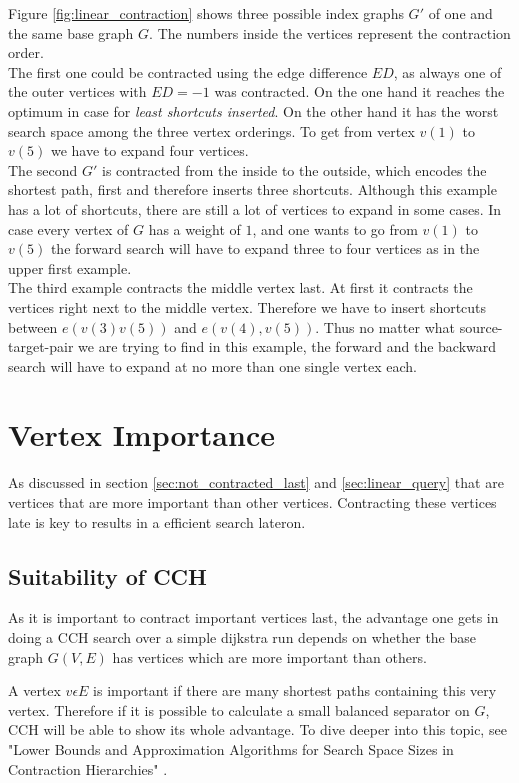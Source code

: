 Figure \ref{fig:linear_contraction} shows three possible index graphs $G'$ of one and the same base graph $G$.
The numbers inside the vertices represent the contraction order.
\\
The first one could be contracted using the edge difference $ED$, as always one of the outer vertices with $ED=-1$ was contracted.
On the one hand it reaches the optimum in case for \textit{least shortcuts inserted}.
On the other hand it has the worst search space among the three vertex orderings.
To get from vertex $v(1)$ to $v(5)$ we have to expand four vertices.
\\
The second $G'$ is contracted from the inside to the outside, which encodes the shortest path, first and therefore inserts three shortcuts.
Although this example has a lot of shortcuts, there are still a lot of vertices to expand in some cases.
In case every vertex of $G$ has a weight of $1$, and one wants to go from $v(1)$ to $v(5)$ the forward search will have to expand three to four vertices as in the upper first example.
\\
The third example contracts the middle vertex last.
At first it contracts the vertices right next to the middle vertex.
Therefore we have to insert shortcuts between $e(v(3)v(5))$ and $e(v(4), v(5))$.
Thus no matter what source-target-pair we are trying to find in this example, the forward and the backward search will have to expand at no more than one single vertex each.

\section{Vertex Importance}\label{sec:vertex_importance}

As discussed in section \ref{sec:not_contracted_last} and \ref{sec:linear_query} that are vertices that are more important than other vertices.
Contracting these vertices late is key to results in a efficient search lateron.


\subsection{Suitability of CCH}

As it is important to contract important vertices last, the advantage one gets in doing a CCH search over a simple dijkstra run depends on whether the base graph $G(V, E)$ has vertices which are more important than others.

A vertex $v \epsilon E$ is important if there are many shortest paths containing this very vertex.
Therefore if it is possible to calculate a small balanced separator on $G$, CCH will be able to show its whole advantage.
To dive deeper into this topic, see "Lower Bounds and Approximation Algorithms for Search Space Sizes in Contraction Hierarchies" \cite{BlumStorandt}.

